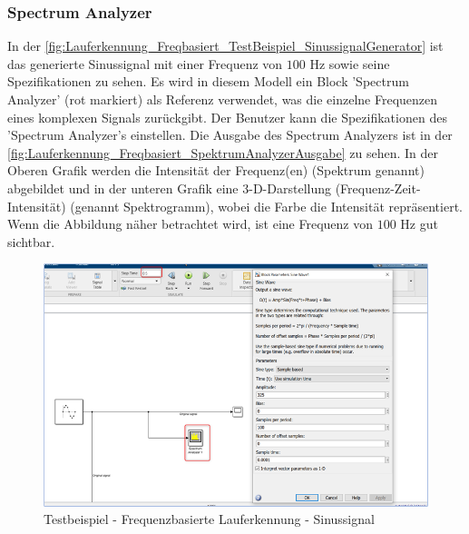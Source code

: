 \subsubsection{Spectrum Analyzer}
In der \autoref{fig:Lauferkennung_Freqbasiert_TestBeispiel_SinussignalGenerator} ist das generierte Sinussignal mit einer Frequenz von $100$ Hz sowie seine Spezifikationen zu sehen.
Es wird in diesem Modell ein Block 'Spectrum Analyzer' (rot markiert) als Referenz verwendet, was die einzelne Frequenzen eines komplexen Signals zurückgibt. Der Benutzer kann die Spezifikationen des 'Spectrum Analyzer's einstellen. Die Ausgabe des Spectrum Analyzers ist in der \autoref{fig:Lauferkennung_Freqbasiert_SpektrumAnalyzerAusgabe} zu sehen. In der Oberen Grafik werden die Intensität der Frequenz(en) (Spektrum genannt) abgebildet und in der unteren Grafik eine 3-D-Darstellung (Frequenz-Zeit-Intensität) (genannt Spektrogramm), wobei die Farbe die Intensität repräsentiert. Wenn die Abbildung näher betrachtet wird, ist eine Frequenz von $100$ Hz gut sichtbar.

\begin{figure}[H]
	\centering
	\includegraphics[width=\linewidth]{Bilder/Lauferkennung_Freqbasiert_TestBeispiel_SinussignalGenerator.png}
	\caption{Testbeispiel - Frequenzbasierte Lauferkennung - Sinussignal}
	\label{fig:Lauferkennung_Freqbasiert_TestBeispiel_SinussignalGenerator}
\end{figure}

